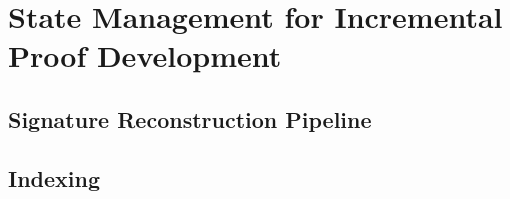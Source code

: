 \chapter{State Management for Incremental Proof Development}


\section{Signature Reconstruction Pipeline}


\section{Indexing}\label{section:indexing}






